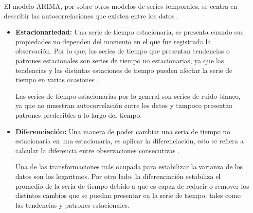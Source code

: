 El modelo ARIMA, por sobre otros modelos de series temporales, se centra en describir las autocorrelaciones que existen entre los datos \cite{forecast-time-series-arima}.

\begin{itemize}
    \item \textbf{Estacionariedad:} Una serie de tiempo estacionaria, se presenta cuando sus propiedades no dependen del momento en el que fue registrada la observación. Por lo que, las series de tiempo que presentan tendencias o patrones estacionales son series de tiempo no estacionarias, ya que las tendencias y las distintas estaciones de tiempo pueden afectar la serie de tiempo en varias ocasiones \cite{forecast-time-series-arima}. 
    
    Las series de tiempo estacionarias por lo general son series de ruido blanco, ya que no muestran autocorrelación entre los datos y tampoco presentan patrones predecibles a lo largo del tiempo. 

    \item \textbf{Diferenciación:} Una manera de poder cambiar una seria de tiempo no estacionaria en una estacionaria, es aplicar la diferenciación, esto se refiera a calcular la diferencia entre observaciones consecutivas \cite{forecast-time-series-arima}.
    
    Una de las transformaciones más ocupada para estabilizar la varianza de los datos son los logaritmos. Por otro lado, la diferenciación estabiliza el promedio de la seria de tiempo debido a que es capaz de reducir o remover los distintos cambios que se puedan presentar en la serie de tiempo, tales como las tendencias y patrones estacionales.
    
    
\end{itemize}